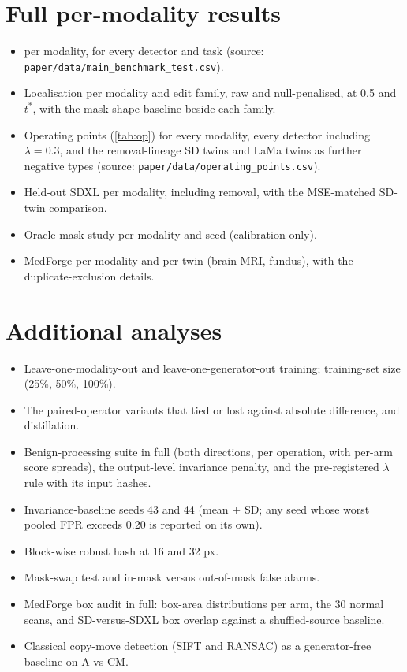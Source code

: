 \section{Full per-modality results}
\begin{itemize}[leftmargin=*,itemsep=1pt]
\item {} per modality, for every detector and task (source: \texttt{paper/data/main\_benchmark\_test.csv}).
\item Localisation per modality and edit family, raw and null-penalised, at 0.5 and $t^\ast$, with the mask-shape baseline beside each family.
\item Operating points (\cref{tab:op}) for every modality, every detector including $\lambda=0.3$, and the removal-lineage SD twins and LaMa twins as further negative types (source: \texttt{paper/data/operating\_points.csv}).
\item Held-out SDXL per modality, including removal, with the MSE-matched SD-twin comparison. 
\item Oracle-mask study per modality and seed (calibration only).
\item MedForge per modality and per twin (brain MRI, fundus), with the duplicate-exclusion details.
\end{itemize}

\section{Additional analyses}
\begin{itemize}[leftmargin=*,itemsep=1pt]
\item Leave-one-modality-out and leave-one-generator-out training; training-set size (25\%, 50\%, 100\%). %
\item The paired-operator variants that tied or lost against absolute difference, and distillation.
\item Benign-processing suite in full (both directions, per operation, with per-arm score spreads), the output-level invariance penalty, and the pre-registered $\lambda$ rule with its input hashes.
\item Invariance-baseline seeds 43 and 44 (mean $\pm$ SD; any seed whose worst pooled FPR exceeds 0.20 is reported on its own). 
\item Block-wise robust hash at 16 and 32 px. 
\item Mask-swap test and in-mask versus out-of-mask false alarms.
\item MedForge box audit in full: box-area distributions per arm, the 30 normal scans, and SD-versus-SDXL box overlap against a shuffled-source baseline.
\item Classical copy-move detection (SIFT and RANSAC) as a generator-free baseline on A-vs-CM.
\end{itemize}

